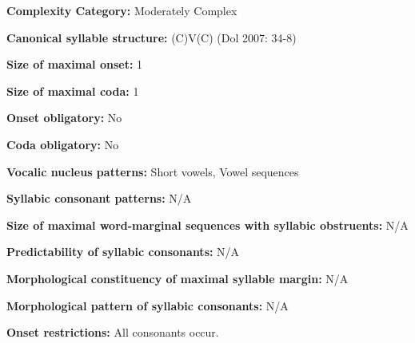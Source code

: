\begin{styleBody}
\textbf{Complexity Category:} Moderately Complex
\end{styleBody}

\begin{styleBody}
\textbf{Canonical syllable structure:} (C)V(C) (Dol 2007: 34-8)
\end{styleBody}

\begin{styleBody}
\textbf{Size of maximal onset:} 1
\end{styleBody}

\begin{styleBody}
\textbf{Size of maximal coda:} 1
\end{styleBody}

\begin{styleBody}
\textbf{Onset obligatory:} No
\end{styleBody}

\begin{styleBody}
\textbf{Coda obligatory:} No
\end{styleBody}

\begin{styleBody}
\textbf{Vocalic nucleus patterns:} Short vowels, Vowel sequences
\end{styleBody}

\begin{styleBody}
\textbf{Syllabic consonant patterns:} N/A
\end{styleBody}

\begin{styleBody}
\textbf{Size of maximal word{}-marginal sequences with syllabic obstruents:} N/A
\end{styleBody}

\begin{styleBody}
\textbf{Predictability of syllabic consonants:} N/A
\end{styleBody}

\begin{styleBody}
\textbf{Morphological constituency of maximal syllable margin:} N/A
\end{styleBody}

\begin{styleBody}
\textbf{Morphological pattern of syllabic consonants:} N/A
\end{styleBody}

\begin{styleBody}
\textbf{Onset restrictions: }All consonants occur.
\end{styleBody}

